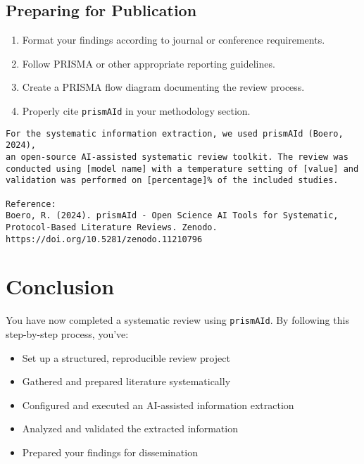 \subsection{Preparing for Publication}

\begin{enumerate}
    \item Format your findings according to journal or conference requirements.
    \item Follow PRISMA or other appropriate reporting guidelines.
    \item Create a PRISMA flow diagram documenting the review process.
    \item Properly cite \texttt{prismAId} in your methodology section.
\end{enumerate}

\begin{commandbox}
\begin{lstlisting}
For the systematic information extraction, we used prismAId (Boero, 2024),
an open-source AI-assisted systematic review toolkit. The review was
conducted using [model name] with a temperature setting of [value] and
validation was performed on [percentage]% of the included studies.

Reference:
Boero, R. (2024). prismAId - Open Science AI Tools for Systematic,
Protocol-Based Literature Reviews. Zenodo.
https://doi.org/10.5281/zenodo.11210796
\end{lstlisting}
\end{commandbox}

\section{Conclusion}

You have now completed a systematic review using \texttt{prismAId}. By following this step-by-step process, you've:

\begin{itemize}
    \item Set up a structured, reproducible review project
    \item Gathered and prepared literature systematically
    \item Configured and executed an AI-assisted information extraction
    \item Analyzed and validated the extracted information
    \item Prepared your findings for dissemination
\end{itemize}

